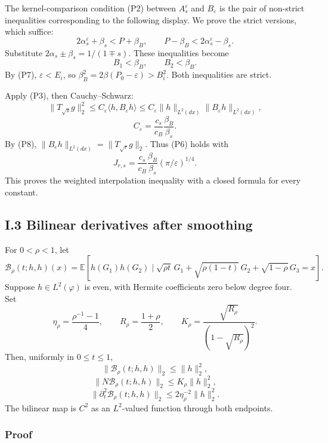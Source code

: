 \documentclass[
  british,
  10pt,
]{article}
\begin{document}
The kernel-comparison condition (P2) between \(A_s^\varepsilon\) and
\(B_\varepsilon\) is the pair of non-strict inequalities corresponding
to the following display. We prove the strict versions, which suffice:
\[
2\alpha_s^\varepsilon+\beta_s<P+\beta_B,\qquad
P-\beta_B<2\alpha_s^\varepsilon-\beta_s.
\] Substitute \(2\alpha_s\pm\beta_s=1/(1\mp s)\). These inequalities
become \[
B_1<\beta_B,\qquad B_2<\beta_B.
\] By (P7), \(\varepsilon<E_i\), so
\(\beta_B^2=2\beta(P_0-\varepsilon)>B_i^2\). Both inequalities are
strict.

Apply (P3), then Cauchy--Schwarz: \[
\|T_{\sqrt s}g\|_2^2
\le C_\varepsilon\langle h,B_\varepsilon h\rangle
\le C_\varepsilon\|h\|_{L^2(dx)}
                  \|B_\varepsilon h\|_{L^2(dx)},
\] \[
C_\varepsilon=\frac{c_s}{c_B}\frac{\beta_B}{\beta_s}.
\] By (P8), \(\|B_\varepsilon h\|_{L^2(dx)}=\|T_{\sqrt r}g\|_2\). Thus
(P6) holds with \[
\boxed{\quad
J_{r,s}=\frac{c_s}{c_B}\frac{\beta_B}{\beta_s}
(\pi/\varepsilon)^{1/4}.
\quad}                                                   \tag{P10}
\] This proves the weighted interpolation inequality with a closed
formula for every constant.

\subsection{I.3 Bilinear derivatives after
smoothing}\label{i.3-bilinear-derivatives-after-smoothing}

For \(0<\rho<1\), let \[
\mathcal B_\rho(t;h,h)(x)=
\mathbb E[h(G_1)h(G_2)\mid
\sqrt{\rho t}\,G_1+\sqrt{\rho(1-t)}\,G_2+
\sqrt{1-\rho}\,G_3=x].
\] Suppose \(h\in L^2(\varphi)\) is even, with Hermite coefficients zero
below degree four. Set \[
\eta_\rho=\frac{\rho^{-1}-1}{4},\qquad
R_\rho=\frac{1+\rho}{2},\qquad
K_\rho=\frac{\sqrt{R_\rho}}{(1-\sqrt{R_\rho})^2}.
\] Then, uniformly in \(0\le t\le1\), \[
\|\mathcal B_\rho(t;h,h)\|_2\le\|h\|_2^2,               \tag{P11}
\] \[
\|N\mathcal B_\rho(t;h,h)\|_2\le K_\rho\|h\|_2^2,        \tag{P12}
\] \[
\|\partial_t^2\mathcal B_\rho(t;h,h)\|_2
\le2\eta_\rho^{-2}\|h\|_2^2.                            \tag{P13}
\] The bilinear map is \(C^2\) as an \(L^2\)-valued function through
both endpoints.

\subsubsection{Proof}\label{proof}
\end{document}
